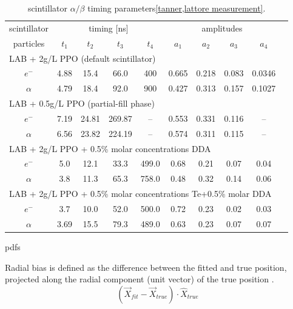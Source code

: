 \begin{table}[ht]
	\caption{\label{scint_timing} scintillator $\alpha/\beta$ timing parameters\ref{tanner,lattore measurement}.}	
	
	
	
	
	{\centering
		\begin{tabular*}{165mm}{c@{\extracolsep{\fill}}*9c}
			\toprule 
			\multicolumn{1}{c}{scintillator} & \multicolumn{4}{c}{timing [ns]} & \multicolumn{4}{c}{amplitudes}\\
			\cline{0-1}\cline{2-5} \cline{6-9}		
			 particles      & $t_1$ & $t_2$ & $t_3$ & $t_4$ & $a_1$ &$a_2$ &$a_3$&$a_4$\\
			\midrule
			\multicolumn{9}{l}{LAB + 2g/L PPO (default scintillator)}\\
			$e^-$ & 4.88 & 15.4 & 66.0 & 400 & 0.665 & 0.218 & 0.083& 0.0346\\	
		    $\alpha$ & 4.79 & 18.4 & 92.0 & 900 & 0.427 & 0.313 & 0.157 & 0.1027\\
		    \hline
		    \multicolumn{9}{l}{LAB + 0.5g/L PPO (partial-fill phase)} \\
			$e^-$& 7.19 & 24.81 & 269.87 & -- &0.553 &0.331 &0.116 & --\\
			$\alpha$& 6.56 &23.82 &224.19&--& 0.574&0.311& 0.115&--\\
			\hline
			\multicolumn{9}{l}{LAB + 2g/L PPO + 0.5\% molar concentrations DDA} \\
			$e^-$ & 5.0& 12.1& 33.3& 499.0& 0.68& 0.21& 0.07& 0.04\\
			$\alpha$ &3.8 &11.3& 65.3& 758.0& 0.48& 0.32& 0.14& 0.06 \\
			\hline
			\multicolumn{9}{l}{LAB + 2g/L PPO + 0.5\% molar concentrations Te+0.5\% molar DDA}\\
			$e^-$ & 3.7 & 10.0 & 52.0  & 500.0 & 0.72 & 0.23 & 0.02 &0.03\\
			$\alpha$ & 3.69 & 15.5 & 79.3  & 489.0 & 0.63 & 0.23 & 0.07 &0.07\\	
			\bottomrule	
		\end{tabular*}
	}
\end{table}


pdfs 



Radial bias is defined as the difference between the fitted and true position, projected along the radial component (unit vector) of the true position \cite{coulter2013modelling}.
\[
(\vec{X}_{fit}-\vec{X}_{true})\cdot \hat{X}_{true}
\]


